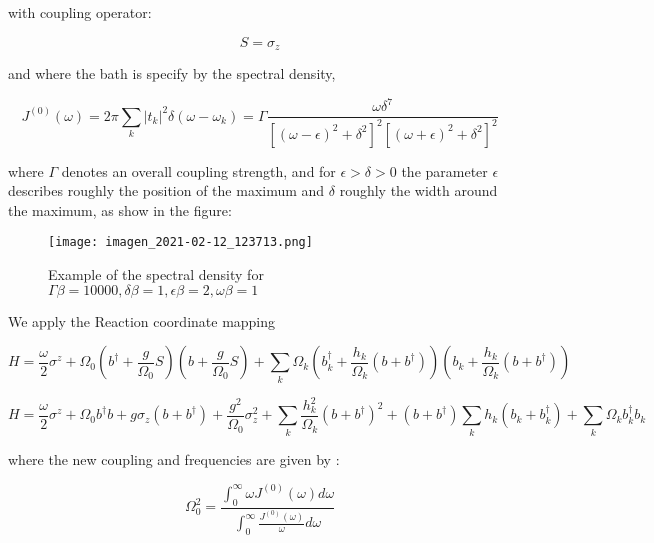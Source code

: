 \documentclass[%
preprint,
onecolumn,
notitlepag,
 amsmath,amssymb,
 aps,
 pra,
]{revtex4-2}
\begin{document}
with coupling operator:

\begin{equation}
    S=\sigma_z
\end{equation}

and where the bath is specify by the spectral density, 

\begin{equation}
J^{(0)}(\omega)=2 \pi \sum_{k}\left|t_{k}\right|^{2} \delta\left(\omega-\omega_{k}\right)=\Gamma \frac{\omega \delta^{7}}{\left[(\omega-\epsilon)^{2}+\delta^{2}\right]^{2}\left[(\omega+\epsilon)^{2}+\delta^{2}\right]^{2}}
\end{equation}

where $\Gamma$ denotes an overall coupling strength, and for $\epsilon>\delta>0$ the parameter $\epsilon$ describes roughly the position of the maximum and $\delta$ roughly the width around the maximum, as show in the figure: 

\begin{figure}[h]
\texttt{[image: imagen\_2021-02-12\_123713.png]}
\caption{Example of the spectral density for $\Gamma \beta=10000, \delta \beta=1, \epsilon \beta=2, \omega \beta=1$}
\end{figure}


We apply the Reaction coordinate mapping


\begin{equation}
H=\frac{\omega}{2} \sigma^{z}+\Omega_{0}\left(b^{\dagger}+\frac{g}{\Omega_{0}} S\right)\left(b+\frac{g}{\Omega_{0}} S\right)+\sum_{k} \Omega_{k}\left(b_{k}^{\dagger}+\frac{h_{k}}{\Omega_{k}}\left(b+b^{\dagger}\right)\right)\left(b_{k}+\frac{h_{k}}{\Omega_{k}}\left(b+b^{\dagger}\right)\right)
\end{equation}

\begin{equation}
    H=\frac{\omega}{2} \sigma^{z} +\Omega_0 b ^{\dagger} b  + g \sigma_z \left( b + b ^{\dagger} \right) + \frac{g^2}{\Omega_0} \sigma_z^2 + \sum_k \frac{h_k^2}{\Omega_k} \left( b + b ^{\dagger} \right)^2 + \left( b + b ^{\dagger} \right) \sum_k h_k \left( b_k + b_k ^{\dagger} \right) + \sum_{k} \Omega_k b_k ^{\dagger} b_k
\end{equation}

where the new coupling and frequencies are given by :

\begin{equation}\Omega_{0}^{2}=\frac{\int_{0}^{\infty} \omega J^{(0)}(\omega) d \omega}{\int_{0}^{\infty} \frac{J^{(0)}(\omega)}{\omega} d \omega}\end{equation}
\end{document}
